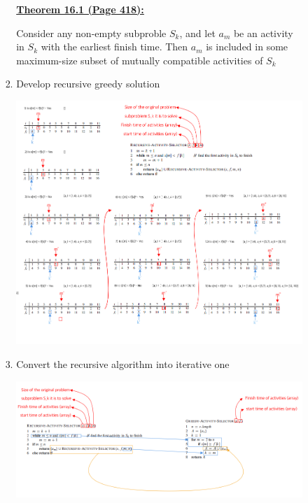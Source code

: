 \documentclass[12pt]{article}
\begin{document}
\begin{enumerate}[1.]
\begin{itemize}
\begin{itemize}
\begin{enumerate}[1.]
                \begin{mdframed}

                \underline{\textbf{Theorem 16.1 (Page 418):}}

                \bigskip

                Consider any non-empty subproble $S_k$, and let $a_m$ be an activity in $S_k$
                with the earliest finish time. Then $a_m$ is included in some maximum-size subset of
                mutually compatible activities of $S_k$

                \end{mdframed}
                \item Develop recursive greedy solution

                \begin{center}
                \includegraphics[width=\linewidth]{images/worksheet_2_solution_1.png}
                \end{center}


                \item Convert the recursive algorithm into iterative one

                \begin{center}
                \includegraphics[width=\linewidth]{images/worksheet_2_solution_2.png}
                \end{center}
            \end{enumerate}
        \end{itemize}
    \end{itemize}


\end{enumerate}
\end{document}
